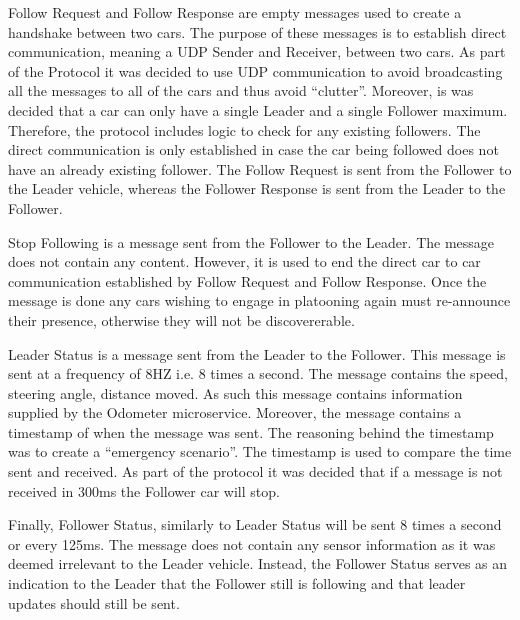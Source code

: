 \documentclass[12pt]{article}
\begin{document}
Follow Request and Follow Response are empty messages used to create a handshake between two cars. The purpose of these messages is to establish direct communication, meaning a UDP Sender and Receiver, between two cars. As part of the Protocol it was decided to use UDP communication to avoid broadcasting all the messages to all of the cars and thus avoid “clutter”. Moreover, is was decided that a car can only have a single Leader and a single Follower maximum. Therefore, the protocol includes logic to check for any existing followers. The direct communication is only established in case the car being followed does not have an already existing follower. The Follow Request is sent from the Follower to the Leader vehicle, whereas the Follower Response is sent from the Leader to the Follower. \par

Stop Following is a message sent from the Follower to the Leader. The message does not contain any content. However, it is used to end the direct car to car communication established by Follow Request and Follow Response. Once the message is done any cars wishing to engage in platooning again must re-announce their presence, otherwise they will not be discovererable. \par

Leader Status is a message sent from the Leader to the Follower. This message is sent at a frequency of 8HZ i.e. 8 times a second. The message contains the speed, steering angle, distance moved. As such this message contains information supplied by the Odometer microservice. Moreover, the message contains a timestamp of when the message was sent. The reasoning behind the timestamp was to create a “emergency scenario”. The timestamp is used to compare the time sent and received. As part of the protocol it was decided that if a message is not received in 300ms the Follower car will stop. \par

Finally, Follower Status, similarly to Leader Status will be sent 8 times a second or every 125ms. The message does not contain any sensor information as it was deemed irrelevant to the Leader vehicle. Instead, the Follower Status serves as an indication to the Leader that the Follower still is following and that leader updates should still be sent. \par
\end{document}
